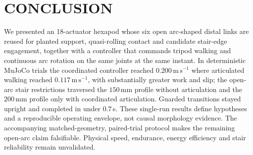 \section{CONCLUSION}

We presented an 18-actuator hexapod whose six open arc-shaped distal links are
reused for planted support, quasi-rolling contact and candidate stair-edge
engagement, together with a controller that commands tripod walking and
continuous arc rotation on the same joints at the same instant. In deterministic
MuJoCo trials the coordinated controller reached $0.200\,\mathrm{m\,s^{-1}}$
where articulated walking reached $0.117\,\mathrm{m\,s^{-1}}$, with substantially
greater work and slip; the open-arc stair restrictions traversed the $150\,$mm
profile without articulation and the $200\,$mm profile only with coordinated
articulation. Guarded transitions stayed upright and completed in under
$0.7\,$s. These single-run results define hypotheses and a reproducible operating
envelope, not causal morphology evidence. The accompanying matched-geometry,
paired-trial protocol makes the remaining open-arc claim falsifiable. Physical
speed, endurance, energy efficiency and stair reliability remain unvalidated.
